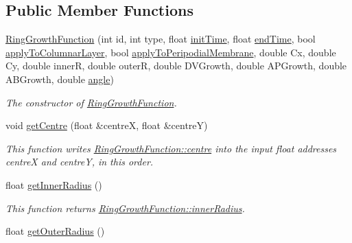 \subsection*{Public Member Functions}
\begin{DoxyCompactItemize}
\item 
\hyperlink{classRingGrowthFunction_a2e12b527d77b74130258ad25dc18e88d}{Ring\+Growth\+Function} (int id, int type, float \hyperlink{classGrowthFunctionBase_ae92513a7b41637df8e26e7db35ddf97c}{init\+Time}, float \hyperlink{classGrowthFunctionBase_a3ff4db0573d354a75666a5f3ca446941}{end\+Time}, bool \hyperlink{classGrowthFunctionBase_a3d56771e7c145589a14e11cc331e0326}{apply\+To\+Columnar\+Layer}, bool \hyperlink{classGrowthFunctionBase_a08ae19f58cb98fa8e315a77f52749732}{apply\+To\+Peripodial\+Membrane}, double Cx, double Cy, double inner\+R, double outer\+R, double D\+V\+Growth, double A\+P\+Growth, double A\+B\+Growth, double \hyperlink{classRingGrowthFunction_add6283d1ad999925c4202a3fa66b76ea}{angle})
\begin{DoxyCompactList}\small\item\em The constructor of \hyperlink{classRingGrowthFunction}{Ring\+Growth\+Function}. \end{DoxyCompactList}\item 
\hypertarget{classRingGrowthFunction_aa2063170e3ee5c5f22d7beef32300e9c}{}void \hyperlink{classRingGrowthFunction_aa2063170e3ee5c5f22d7beef32300e9c}{get\+Centre} (float \&centre\+X, float \&centre\+Y)\label{classRingGrowthFunction_aa2063170e3ee5c5f22d7beef32300e9c}

\begin{DoxyCompactList}\small\item\em This function writes \hyperlink{classRingGrowthFunction_a5b8f1cc72d03907bb1492e6c2f288db0}{Ring\+Growth\+Function\+::centre} into the input float addresses centre\+X and centre\+Y, in this order. \end{DoxyCompactList}\item 
\hypertarget{classRingGrowthFunction_ae1f4f4cecfab3ec343c748cfe78ab70b}{}float \hyperlink{classRingGrowthFunction_ae1f4f4cecfab3ec343c748cfe78ab70b}{get\+Inner\+Radius} ()\label{classRingGrowthFunction_ae1f4f4cecfab3ec343c748cfe78ab70b}

\begin{DoxyCompactList}\small\item\em This function returns \hyperlink{classRingGrowthFunction_a4e8796fbbbe9fe18c2dcd04613effcf0}{Ring\+Growth\+Function\+::inner\+Radius}. \end{DoxyCompactList}\item 
\hypertarget{classRingGrowthFunction_ad5c890c72a8ce520411d28e929faec19}{}float \hyperlink{classRingGrowthFunction_ad5c890c72a8ce520411d28e929faec19}{get\+Outer\+Radius} ()\label{classRingGrowthFunction_ad5c890c72a8ce520411d28e929faec19}


\end{DoxyCompactItemize}
